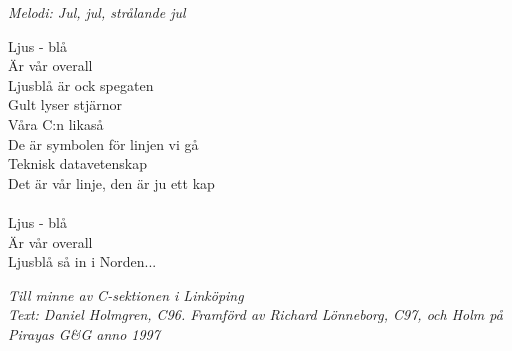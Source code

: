 {\footnotesize\textit{Melodi: Jul, jul, strålande jul}}\par
\vspace{10pt}
Ljus - blå\\
Är vår overall\\
Ljusblå är ock spegaten\\
Gult lyser stjärnor\\
Våra C:n likaså\\
De är symbolen för linjen vi gå\\
Teknisk datavetenskap\\
Det är vår linje, den är ju ett kap\\
\\
Ljus - blå\\
Är vår overall\\
Ljusblå så in i Norden...
\par
\vspace{10pt}
{\footnotesize\textit{Till minne av C-sektionen i Linköping\\ Text: Daniel Holmgren, C96. Framförd av Richard Lönneborg, C97, och Holm på Pirayas G\&G anno 1997}}

